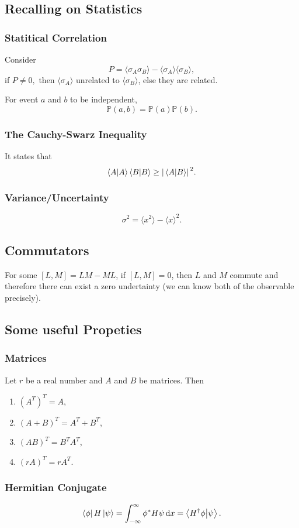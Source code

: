 \documentclass[a4paper]{article}
\begin{document}
\subsection{Recalling on Statistics}
\subsubsection{Statitical Correlation}
Consider 
\[
    P = \langle \sigma_A \sigma_B \rangle - \langle \sigma_A \rangle \langle \sigma_B \rangle,
\]
if $P \neq 0,$ then $\langle \sigma_A \rangle$ unrelated to $\langle \sigma_B \rangle$, else they are related.\\

\par For event $a$ and $b$ to be independent,
\[
    \mathbb{P}(a,b) = \mathbb{P}(a) \mathbb{P}(b).
\]  
\subsubsection{The Cauchy-Swarz Inequality}
It states that 
\[
    \braket{A}{A}\braket{B}{B} \geq \abs*{\braket*{A}{B}}^2.
\]  

\subsubsection{Variance/Uncertainty}
\[
      \sigma^2 = \langle x^2 \rangle - \langle x \rangle^2.
\]
\subsection{Commutators}
For some $[L,M]=LM-ML$, if $[L, M] = 0$, then $L$ and $M$ commute and therefore there can exist a zero undertainty (we can know both of the observable precisely).

\subsection{Some useful Propeties}
\subsubsection{Matrices}
Let $r$ be a real number and $A$ and $B$ be matrices. Then
\begin{enumerate}
    \item $(A^T)^T=A$,
    \item $(A+B)^T=A^T+B^T$,
    \item $(AB)^T=B^T A^T$,
    \item $(rA)^T=rA^T$.
\end{enumerate}

\subsubsection{Hermitian Conjugate}
\[
    \bra{\phi}H\ket{\psi} = \int_{-\infty}^{\infty}\phi^* H \psi \, \mathrm{d}x = \braket{H^\dagger \phi}{\psi}.
\]













\end{document}
